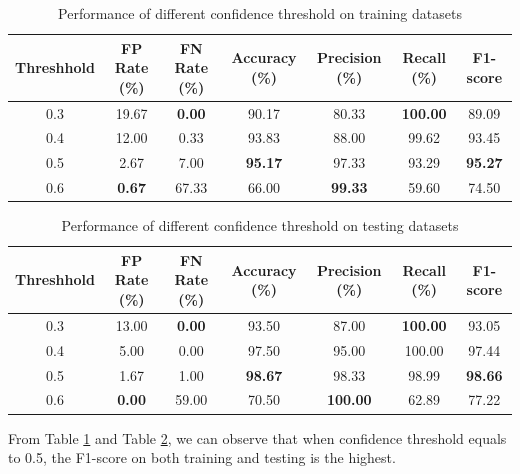 \documentclass{article}[12pt, twocolumn]
\begin{document}
\begin{table}[H]
    \centering
    \caption{Performance of different confidence threshold on training datasets}
    \begin{tabular}{@{}ccccccc@{}}
    \toprule
    Threshhold & FP Rate (\%)  & FN Rate (\%)  & Accuracy (\%)  & Precision (\%) & Recall (\%)     & F1-score       \\ \midrule
    0.3        & 19.67         & \textbf{0.00} & 90.17          & 80.33          & \textbf{100.00} & 89.09          \\
    0.4        & 12.00         & 0.33          & 93.83          & 88.00          & 99.62           & 93.45          \\
    0.5        & 2.67          & 7.00          & \textbf{95.17} & 97.33          & 93.29           & \textbf{95.27} \\
    0.6        & \textbf{0.67} & 67.33         & 66.00          & \textbf{99.33} & 59.60           & 74.50          \\ \bottomrule
    \end{tabular}
    \label{tab: yolo_train}
\end{table}

\begin{table}[H]
    \centering
    \caption{Performance of different confidence threshold on testing datasets}
    \begin{tabular}{@{}ccccccc@{}}
    \toprule
    Threshhold & FP Rate (\%)  & FN Rate (\%)  & Accuracy (\%)  & Precision (\%)  & Recall (\%)     & F1-score       \\ \midrule
    0.3        & 13.00         & \textbf{0.00} & 93.50          & 87.00           & \textbf{100.00} & 93.05          \\
    0.4        & 5.00          & 0.00          & 97.50          & 95.00           & 100.00          & 97.44          \\
    0.5        & 1.67          & 1.00          & \textbf{98.67} & 98.33           & 98.99           & \textbf{98.66} \\
    0.6        & \textbf{0.00} & 59.00         & 70.50          & \textbf{100.00} & 62.89           & 77.22          \\ \bottomrule
    \end{tabular}
    \label{tab: yolo_test}
\end{table}

From Table \ref{tab: yolo_train} and Table \ref{tab: yolo_test}, 
we can observe that when confidence threshold equals to 0.5, the F1-score on both
training and testing is the highest.
\end{document}
